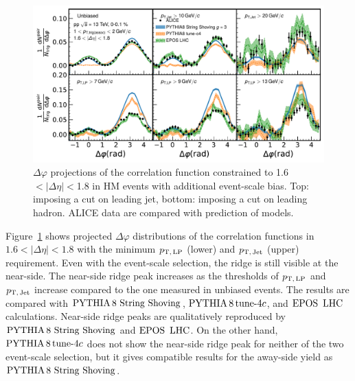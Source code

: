 \begin{figure}[h!]
	\centering
	\includegraphics[width=0.99\linewidth]{./figures/Fig5_PlotDeltaPhiESE.pdf}
	\caption{ $\Delta\varphi$ projections of the correlation function constrained to 1.6$<|\Delta\eta|<$1.8 in HM events with additional event-scale bias. Top: imposing a cut on leading jet,  bottom: imposing a cut on leading hadron. ALICE data are compared with prediction of models.}
	\label{fig:PlotDeltaPhiESE}
\end{figure}

Figure~\ref{fig:PlotDeltaPhiESE} shows projected $\Delta\varphi$ distributions of the correlation functions in $1.6<|\Delta\eta|<1.8$ with the minimum $p_\mathrm{T,\,LP}$ (lower) and $p_\mathrm{T,\,Jet}$ (upper) requirement. Even with the event-scale selection, the ridge is still visible at the near-side. The near-side ridge peak increases as the thresholds of $p_\mathrm{T,\,LP}$ and $p_\mathrm{T,\,Jet}$ increase compared to the one measured in unbiased events. The results are compared with ${\mathrm{PYTHIA}\,8~\mathrm{String}~}\mathrm{Shoving}$, $\mathrm{PYTHIA}\,8\,\mathrm{tune}{\text -}4c$, and ${\mathrm{EPOS}\,~\mathrm{LHC}}$ calculations. Near-side ridge peaks are qualitatively reproduced by ${\mathrm{PYTHIA}\,8~\mathrm{String}~}\mathrm{Shoving}$ and ${\mathrm{EPOS}\,~\mathrm{LHC}}$. On the other hand, $\mathrm{PYTHIA}\,8\,\mathrm{tune}{\text -}4c$ does not show the  near-side ridge peak for neither of the two event-scale selection, but it gives compatible results for the away-side yield as ${\mathrm{PYTHIA}\,8~\mathrm{String}~}\mathrm{Shoving}$.

